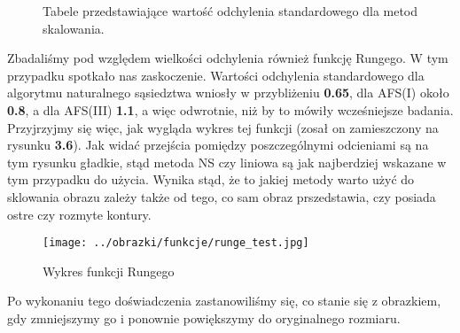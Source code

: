 \begin{figure}[h!tb]
\begin{center}
\caption{Tabele przedstawiające wartość odchylenia standardowego dla metod skalowania.}
\end{center}
\end{figure}

Zbadaliśmy pod względem wielkości odchylenia również funkcję Rungego. W tym przypadku spotkało
nas zaskoczenie. Wartości odchylenia standardowego dla algorytmu naturalnego sąsiedztwa wniosły
w przybliżeniu \textbf{0.65}, dla AFS(I) około \textbf{0.8}, a dla AFS(III) \textbf{1.1}, a więc
odwrotnie, niż by to mówiły wcześniejsze badania. Przyjrzyjmy się więc, jak wygląda wykres tej funkcji
(zosał on zamieszczony na rysunku \textbf{3.6}). Jak widać przejścia pomiędzy poszczególnymi odcieniami
są na tym rysunku gładkie, stąd metoda NS czy liniowa są jak najberdziej wskazane w tym przypadku do użycia.
Wynika stąd, że to jakiej metody warto użyć do sklowania obrazu zależy także od tego, co sam obraz prszedstawia,
czy posiada ostre czy rozmyte kontury.
\begin{figure}[h!tb]
\begin{center}
\texttt{[image: ../obrazki/funkcje/runge\_test.jpg]}
\caption{Wykres funkcji Rungego}
\end{center}
\end{figure}

Po wykonaniu tego doświadczenia zastanowiliśmy się, co stanie się z obrazkiem, gdy zmniejszymy go i ponownie powiększymy do oryginalnego rozmiaru.





